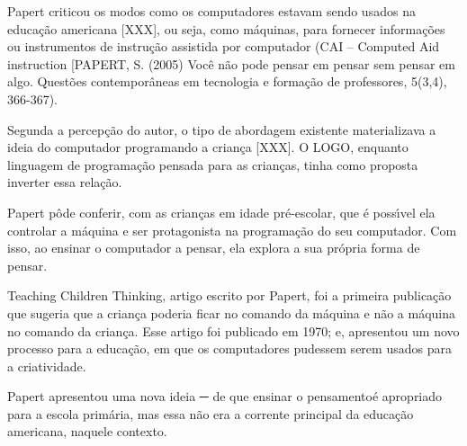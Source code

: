 \documentclass[
12pt,		%
openright,	%
twoside,  %
a4paper,			%
chapter=TITLE,		%
english,			%
french,				%
spanish,			%
brazil				%
]{USPSC-classe/USPSC}
\begin{document}
Papert criticou os modos como os computadores estavam sendo usados na educa\c{c}\~ao americana [XXX], ou seja, como m\'aquinas, para fornecer informa\c{c}\~oes ou instrumentos de instru\c{c}\~ao assistida por computador (CAI – Computed Aid instruction [PAPERT, S. (2005) Voc\^e n\~ao pode pensar em pensar sem pensar em algo. Quest\~oes contempor\^aneas em tecnologia e forma\c{c}\~ao de professores, 5(3,4), 366-367).














Segunda a percep\c{c}\~ao do autor, o tipo de abordagem existente materializava a ideia do computador programando a crian\c{c}a [XXX]. O LOGO, enquanto linguagem de programa\c{c}\~ao pensada para as crian\c{c}as, tinha como proposta inverter essa rela\c{c}\~ao.














Papert p\^ode conferir, com as crian\c{c}as em idade pr\'e-escolar, que \'e poss\'{\i}vel ela controlar a m\'aquina e ser protagonista na programa\c{c}\~ao do seu computador. Com isso, ao ensinar o computador a pensar, ela explora a sua pr\'opria forma de pensar.














Teaching Children Thinking, artigo escrito por Papert, foi a primeira publica\c{c}\~ao que sugeria que a crian\c{c}a poderia ficar no comando da m\'aquina e n\~ao a m\'aquina no comando da crian\c{c}a.  Esse artigo  foi publicado em 1970; e,  apresentou um novo processo para a educa\c{c}\~ao, em que os computadores pudessem serem usados para a criatividade.














Papert apresentou uma nova ideia  ─ de que \textquotedbl ensinar o pensamento\textquotedbl   \'e apropriado para a escola prim\'aria, mas essa n\~ao era a corrente principal da educa\c{c}\~ao americana, naquele contexto.
\end{document}
